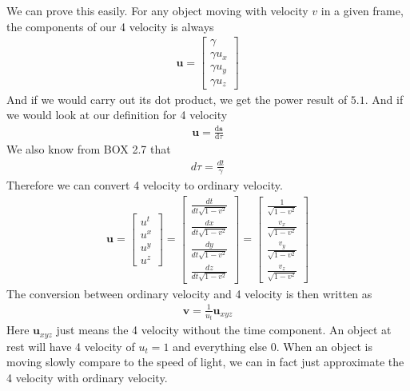 \documentclass[12pt]{book}
\newcommand{\dydx}[2]{\frac{\text{d} #1}{\text{d} #2}}
\begin{document}
We can prove this easily. For any object moving with velocity $v$ in a given frame, the components of our 4 velocity is always
\begin{align}
\mathbf{u}=\begin{bmatrix}
    \gamma\\ \gamma u_x \\ \gamma u_y \\\gamma u_z 
\end{bmatrix}
\end{align}
And if we would carry out its dot product, we get the power result of $5.1$. And if we would look at our definition for 4 velocity
\begin{align}
\mathbf{u} = \dydx{\mathbf{s}}{\tau}
\end{align}
We also know from BOX 2.7 that
\begin{align}
d\tau = \frac{dt}{\gamma}
\end{align}
Therefore we can convert 4 velocity to ordinary velocity.
\begin{align}
\mathbf{u}= 
\begin{bmatrix}
u^t \\
u^x \\
u^y \\
u^z
\end{bmatrix}
=
\begin{bmatrix}
\frac{dt}{dt\sqrt{1 - v^2}} \\
\frac{dx}{dt\sqrt{1 - v^2}} \\
\frac{dy}{dt\sqrt{1 - v^2}} \\
\frac{dz}{dt\sqrt{1 - v^2}}
\end{bmatrix}
=
\begin{bmatrix}
\frac{1}{\sqrt{1 - v^2}} \\
\frac{v_x}{\sqrt{1 - v^2}} \\
\frac{v_y}{\sqrt{1 - v^2}} \\
\frac{v_z}{\sqrt{1 - v^2}}
\end{bmatrix}
\end{align}
The conversion between ordinary velocity and 4 velocity is then written as
\begin{align}
\mathbf{v} = \frac{1}{u_t}\mathbf{u}_{xyz}
\end{align}
Here $\mathbf{u}_{xyz}$ just means the 4 velocity without the time component. An object at rest will have 4 velocity of $u_t = 1$ and everything else $0$. When an object is moving slowly compare to the speed of light, we can in fact just approximate the 4 velocity with ordinary velocity.
\end{document}
